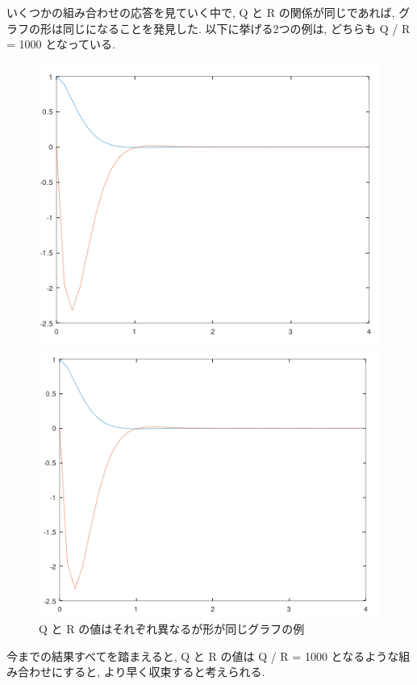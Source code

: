 \documentclass{jsarticle}
\begin{document}
いくつかの組み合わせの応答を見ていく中で, Q と R の関係が同じであれば, グラフの形は同じになること\hspace*{1zw}を発見した.
以下に挙げる2つの例は, どちらも Q / R = 1000 となっている.
\begin{figure}[htbp]
  \begin{minipage}[t]{0.5\linewidth}
    \centering
    \includegraphics[keepaspectratio, scale=0.455]{fig/q1000_r1.png}
  \end{minipage}
  \begin{minipage}[t]{0.5\linewidth}
    \centering
    \includegraphics[keepaspectratio, scale=0.46]{fig/q50000_r50.png}
  \end{minipage}\vspace*{2mm}
  \caption{Q と R の値はそれぞれ異なるが形が同じグラフの例}
\end{figure}

\vspace*{4mm}
今までの結果すべてを踏まえると, Q と R の値は Q / R = 1000 となるような組み合わせにすると, より\hspace*{1zw}早く収束すると考えられる.
\end{document}
